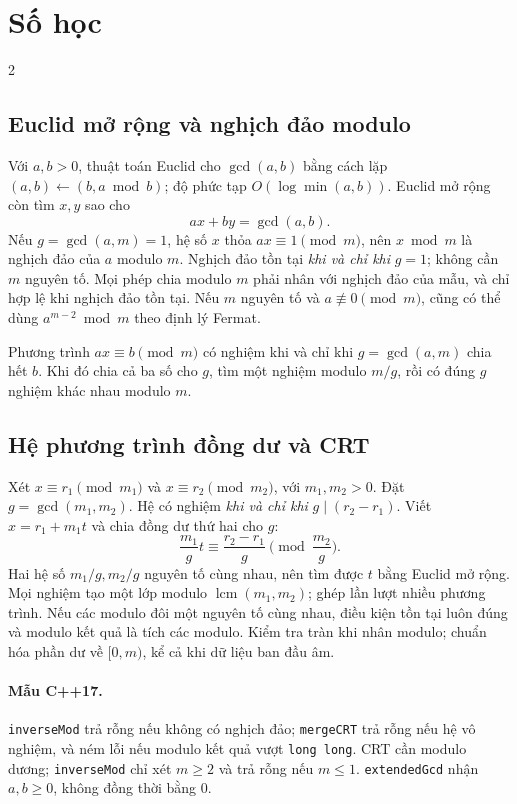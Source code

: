 \section{Số học}
\begingroup\small
\begin{multicols}{2}
\subsection{Euclid mở rộng và nghịch đảo modulo}
Với $a,b>0$, thuật toán Euclid cho $\gcd(a,b)$ bằng cách lặp
$(a,b)\leftarrow(b,a\bmod b)$; độ phức tạp $O(\log\min(a,b))$.
Euclid mở rộng còn tìm $x,y$ sao cho
\[
ax+by=\gcd(a,b).
\]
Nếu $g=\gcd(a,m)=1$, hệ số $x$ thỏa $ax\equiv1\pmod m$,
nên $x\bmod m$ là nghịch đảo của $a$ modulo $m$.
Nghịch đảo tồn tại \emph{khi và chỉ khi} $g=1$; không cần $m$
nguyên tố. Mọi phép chia modulo $m$ phải nhân với nghịch đảo
của mẫu, và chỉ hợp lệ khi nghịch đảo tồn tại.
Nếu $m$ nguyên tố và $a\not\equiv0\pmod m$, cũng có thể dùng
$a^{m-2}\bmod m$ theo định lý Fermat.

Phương trình $ax\equiv b\pmod m$ có nghiệm khi và chỉ khi
$g=\gcd(a,m)$ chia hết $b$. Khi đó chia cả ba số cho $g$,
tìm một nghiệm modulo $m/g$, rồi có đúng $g$ nghiệm khác nhau
modulo $m$.

\subsection{Hệ phương trình đồng dư và CRT}
Xét $x\equiv r_1\pmod{m_1}$ và $x\equiv r_2\pmod{m_2}$,
với $m_1,m_2>0$. Đặt $g=\gcd(m_1,m_2)$. Hệ có nghiệm
\emph{khi và chỉ khi} $g\mid(r_2-r_1)$.
Viết $x=r_1+m_1t$ và chia đồng dư thứ hai cho $g$:
\[
\frac{m_1}{g}t\equiv\frac{r_2-r_1}{g}
\pmod{\frac{m_2}{g}}.
\]
Hai hệ số $m_1/g,m_2/g$ nguyên tố cùng nhau, nên tìm được
$t$ bằng Euclid mở rộng. Mọi nghiệm tạo một lớp modulo
$\operatorname{lcm}(m_1,m_2)$; ghép lần lượt nhiều phương trình.
Nếu các modulo đôi một nguyên tố cùng nhau, điều kiện tồn tại
luôn đúng và modulo kết quả là tích các modulo.
Kiểm tra tràn khi nhân modulo; chuẩn hóa phần dư về $[0,m)$,
kể cả khi dữ liệu ban đầu âm.

\paragraph{Mẫu C++17.}
\texttt{inverseMod} trả rỗng nếu không có nghịch đảo;
\texttt{mergeCRT} trả rỗng nếu hệ vô nghiệm, và ném lỗi nếu
modulo kết quả vượt \texttt{long long}. CRT cần modulo dương;
\texttt{inverseMod} chỉ xét $m\ge2$ và trả rỗng nếu $m\le1$.
\texttt{extendedGcd} nhận $a,b\ge0$, không đồng thời bằng $0$.


\end{multicols}
